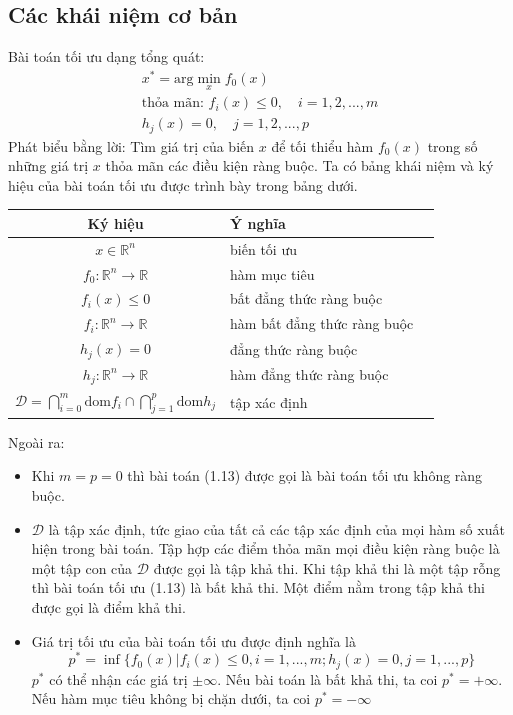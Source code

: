 \documentclass[12pt,a4paper]{report}
\begin{document}
\subsection{Các khái niệm cơ bản}
Bài toán tối ưu dạng tổng quát: \begin{eqnarray}
	x^* = \text{arg} \min_x f_0(x)\\\text{thỏa mãn: } f_i(x) \leq 0, \quad i = 1,2,...,m \nonumber\\h_j(x) = 0, \quad j = 1,2,..., p \nonumber
\end{eqnarray}
Phát biểu bằng lời: Tìm giá trị của biến $x$ để tối thiểu hàm $f_0(x)$ trong số những giá trị $x$ thỏa mãn các điều kiện ràng buộc. Ta có bảng khái niệm và ký hiệu của bài toán tối ưu được trình bày trong bảng dưới.
\begin{center}
	\begin{tabular}{|c|l|l|}
		\hline
		\textbf{Ký hiệu}& \textbf{Ý nghĩa } \\
		\hline
		$x \in \mathbb{R}^n$ & biến tối ưu \\
		\hline
		$f_0: \mathbb{R}^n \to \mathbb{R}$ &hàm mục tiêu \\
		\hline
		$f_i(x) \leq 0$& bất đẳng thức ràng buộc \\
		\hline
		$f_i: \mathbb{R}^n \to \mathbb{R}$& hàm bất đẳng thức ràng buộc \\
		\hline
		$h_j(x) = 0$& đẳng thức ràng buộc \\
		\hline
		$h_j: \mathbb{R}^n \to \mathbb{R}$& hàm đẳng thức ràng buộc \\
		\hline
		$\mathcal{D} = \bigcap_{i=0}^m\text{dom}f_i \cap \bigcap_{j=1}^p\text{dom}h_j$& tập xác định\\
		\hline
	\end{tabular}

\end{center}
Ngoài ra:
\begin{itemize}
	\item Khi $m = p = 0$ thì bài toán (1.13) được gọi là bài toán tối ưu không ràng buộc.
	\item $\mathcal{D}$ là tập xác định, tức giao của tất cả các tập xác định của mọi hàm số xuất hiện trong bài toán. Tập hợp các điểm thỏa mãn mọi điều kiện ràng buộc là một tập con của $\mathcal{D}$ được gọi là tập khả thi. Khi tập khả thi là một tập rỗng thì bài toán tối ưu (1.13) là bất khả thi. Một điểm nằm trong tập khả thi được gọi là điểm khả thi.
	\item Giá trị tối ưu của bài toán tối ưu được định nghĩa là $$p^* = \inf\{f_0(x)|f_i(x) \leq 0, i = 1, ..., m; h_j(x) = 0, j=1,..., p\}$$
	$p^*$ có thể nhận các giá trị $\pm \infty$. Nếu bài toán là bất khả thi, ta coi $p^* = + \infty$. Nếu hàm mục tiêu không bị chặn dưới, ta coi $p^* = -\infty$
\end{itemize}
\end{document}
